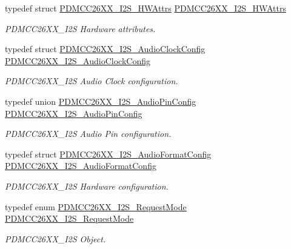\begin{DoxyCompactItemize}
typedef struct \hyperlink{struct_p_d_m_c_c26_x_x___i2_s___h_w_attrs}{P\+D\+M\+C\+C26\+X\+X\+\_\+\+I2\+S\+\_\+\+H\+W\+Attrs} \hyperlink{_p_d_m_c_c26_x_x__util_8h_a8e141a2dcd47376258fe58167a990027}{P\+D\+M\+C\+C26\+X\+X\+\_\+\+I2\+S\+\_\+\+H\+W\+Attrs}
\begin{DoxyCompactList}\small\item\em P\+D\+M\+C\+C26\+X\+X\+\_\+\+I2\+S Hardware attributes. \end{DoxyCompactList}\item 
typedef struct \hyperlink{struct_p_d_m_c_c26_x_x___i2_s___audio_clock_config}{P\+D\+M\+C\+C26\+X\+X\+\_\+\+I2\+S\+\_\+\+Audio\+Clock\+Config} \hyperlink{_p_d_m_c_c26_x_x__util_8h_a8def7a5770e8bb7c904727e21cdf1fb9}{P\+D\+M\+C\+C26\+X\+X\+\_\+\+I2\+S\+\_\+\+Audio\+Clock\+Config}
\begin{DoxyCompactList}\small\item\em P\+D\+M\+C\+C26\+X\+X\+\_\+\+I2\+S Audio Clock configuration. \end{DoxyCompactList}\item 
typedef union \hyperlink{union_p_d_m_c_c26_x_x___i2_s___audio_pin_config}{P\+D\+M\+C\+C26\+X\+X\+\_\+\+I2\+S\+\_\+\+Audio\+Pin\+Config} \hyperlink{_p_d_m_c_c26_x_x__util_8h_ae4dd5264f128d13849211fc9baf12bea}{P\+D\+M\+C\+C26\+X\+X\+\_\+\+I2\+S\+\_\+\+Audio\+Pin\+Config}
\begin{DoxyCompactList}\small\item\em P\+D\+M\+C\+C26\+X\+X\+\_\+\+I2\+S Audio Pin configuration. \end{DoxyCompactList}\item 
typedef struct \hyperlink{struct_p_d_m_c_c26_x_x___i2_s___audio_format_config}{P\+D\+M\+C\+C26\+X\+X\+\_\+\+I2\+S\+\_\+\+Audio\+Format\+Config} \hyperlink{_p_d_m_c_c26_x_x__util_8h_a3ba2d6efa7148c2657a7288f8fbc675c}{P\+D\+M\+C\+C26\+X\+X\+\_\+\+I2\+S\+\_\+\+Audio\+Format\+Config}
\begin{DoxyCompactList}\small\item\em P\+D\+M\+C\+C26\+X\+X\+\_\+\+I2\+S Hardware configuration. \end{DoxyCompactList}\item 
typedef enum \hyperlink{_p_d_m_c_c26_x_x__util_8h_aef896b2a7fc07d3b145f8d02eaa9e377}{P\+D\+M\+C\+C26\+X\+X\+\_\+\+I2\+S\+\_\+\+Request\+Mode} \hyperlink{_p_d_m_c_c26_x_x__util_8h_a3efab417bd3d431079d133bbbe062c22}{P\+D\+M\+C\+C26\+X\+X\+\_\+\+I2\+S\+\_\+\+Request\+Mode}
\begin{DoxyCompactList}\small\item\em P\+D\+M\+C\+C26\+X\+X\+\_\+\+I2\+S Object. \end{DoxyCompactList}\item 

\end{DoxyCompactItemize}
